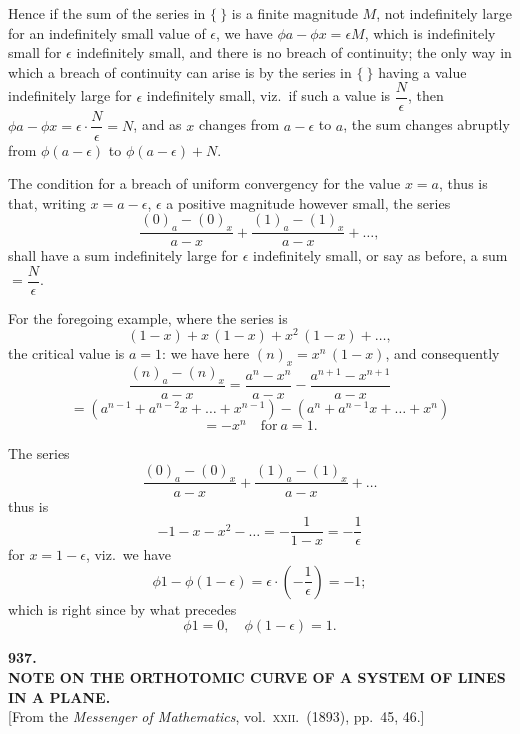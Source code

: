 \documentclass[11pt]{article}
\begin{document}
Hence if the sum of the series in $\{\ \}$ is a finite magnitude $M$, not indefinitely large for an indefinitely small value of $\epsilon$, we have $\phi a - \phi x = \epsilon M$, which is indefinitely small for $\epsilon$ indefinitely small, and there is no breach of continuity; the only way in which a breach of continuity can arise is by the series in $\{\ \}$ having a value indefinitely large for $\epsilon$ indefinitely small, viz.\ if such a value is $\dfrac{N}{\epsilon}$, then $\phi a - \phi x = \epsilon\cdot\dfrac{N}{\epsilon} = N$, and as $x$ changes from $a - \epsilon$ to $a$, the sum changes abruptly from $\phi(a - \epsilon)$ to $\phi(a - \epsilon) + N$.

The condition for a breach of uniform convergency for the value $x = a$, thus is that, writing $x = a - \epsilon$, $\epsilon$ a positive magnitude however small, the series
\[
\frac{(0)_a - (0)_x}{a - x} + \frac{(1)_a - (1)_x}{a - x} + \ldots,
\]
shall have a sum indefinitely large for $\epsilon$ indefinitely small, or say as before, a sum $= \dfrac{N}{\epsilon}$.

For the foregoing example, where the series is
\[
(1 - x) + x\,(1 - x) + x^2\,(1 - x) + \ldots,
\]
the critical value is $a = 1$: we have here $(n)_x = x^n\,(1 - x)$, and consequently
\[
\frac{(n)_a - (n)_x}{a - x} = \frac{a^n - x^n}{a - x} - \frac{a^{n+1} - x^{n+1}}{a - x}
\]
\[
= (a^{n-1} + a^{n-2} x + \ldots + x^{n-1}) - (a^n + a^{n-1} x + \ldots + x^n)
\]
\[
= -x^n\quad\text{for}\ a = 1.
\]

The series
\[
\frac{(0)_a - (0)_x}{a - x} + \frac{(1)_a - (1)_x}{a - x} + \ldots
\]
thus is
\[
-1 - x - x^2 - \ldots = -\frac{1}{1 - x} = -\frac{1}{\epsilon}
\]
for $x = 1 - \epsilon$, viz.\ we have
\[
\phi 1 - \phi (1 - \epsilon) = \epsilon\cdot\left(-\frac{1}{\epsilon}\right) = -1;
\]
which is right since by what precedes
\[
\phi 1 = 0,\quad \phi(1 - \epsilon) = 1.
\]

\clearpage
\begin{center}
{\large\bfseries 937.}\\[0.5em]
{\large\bfseries NOTE ON THE ORTHOTOMIC CURVE OF A SYSTEM OF LINES IN A PLANE.}\\[0.5em]
{\small [From the \textit{Messenger of Mathematics}, vol.\ \textsc{xxii}.\ (1893), pp.\ 45, 46.]}
\end{center}
\vspace{0.5em}
\end{document}
